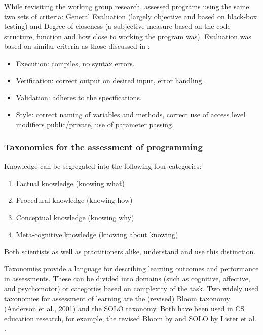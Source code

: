 While revisiting the \citeauthor{McCracken2001} working group research,  assessed programs using the same two sets of criteria: General Evaluation (largely objective and based on black-box testing) and Degree-of-closeness (a subjective measure based on the code structure, function and how close to working the program was). Evaluation was based on similar criteria as those discussed in \cite{smith2005rubricsCriteria}:
\begin{itemize}
\item Execution: compiles, no syntax errors.
\item Verification: correct output on desired input, error handling.
\item Validation: adheres to the specifications.
\item Style: correct naming of variables and methods, correct use of access level modifiers public/private, use of parameter passing.
\end{itemize}




\subsubsection{Taxonomies for the assessment of programming}\label{sec:taxProgramming}


Knowledge can be segregated into the following four categories:
\begin{enumerate}
\item Factual knowledge (knowing what)
\item Procedural knowledge (knowing how)
\item Conceptual knowledge (knowing why)
\item Meta-cognitive knowledge (knowing about knowing)
\end{enumerate}\cite{streun2001kennis}
Both scientists as well as practitioners alike, understand and use this distinction.


Taxonomies provide a language for describing learning outcomes and performance in assessments. These can be divided into domains (such as cognitive, affective, and psychomotor) or categories based on complexity of the task. Two widely used taxonomies for assessment of learning are the (revised) Bloom taxonomy (Anderson et al., 2001) and the SOLO taxonomy. Both have been used in CS education research, for example, the revised Bloom by  and SOLO by Lister et al. \cite{lister2006not}\cite{lister2010naturally}.





